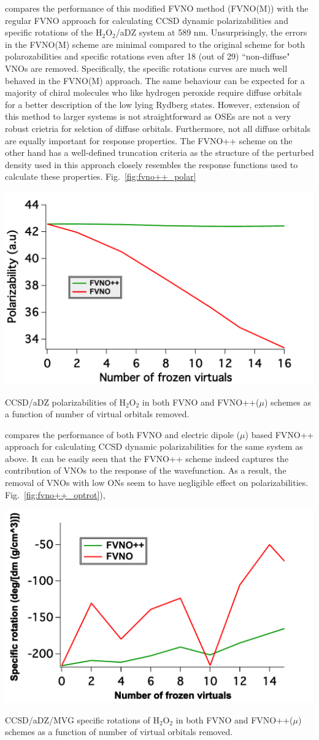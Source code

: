compares the performance of this modified FVNO method (FVNO(M)) with the regular 
FVNO approach for calculating CCSD dynamic polarizabilities and specific rotations 
of the H$_2$O$_2$/aDZ system at 589 nm. Unsurprisingly, the errors in the FVNO(M) 
scheme are minimal compared to the original scheme for both polarozabilities and 
specific rotations even after 18 (out of 29) ``non-diffuse" VNOs are removed.
Specifically, the specific rotations curves are much well behaved in the 
FVNO(M) approach. The same behaviour can be expected for a majority of chiral molecules who 
like hydrogen peroxide require diffuse orbitals for a better description of the low lying 
Rydberg states. However, extension of this method to larger systems is not straightforward as OSEs are not a very robust 
crietria for selction of diffuse orbitals. Furthermore, not all diffuse orbitals 
are equally important for response properties. The FVNO++ scheme on the other
hand has a well-defined truncation criteria as the structure of the perturbed density
used in this approach closely resembles the response functions used to 
calculate these properties. Fig.~\ref{fig:fvno++_polar} 
\begin{MyFigure}[h!]
\centering
\includegraphics[width=0.6\linewidth]{figures_fvno++/fvno++_h2o2_adz_polar.pdf}
\caption{{\footnotesize CCSD/aDZ polarizabilities of
H$_2$O$_2$ in both FVNO and FVNO++($\mu$) schemes as a function of
number of virtual orbitals removed.}}
\label{fig:fvno++_polar}
\end{MyFigure}
compares the performance of both FVNO and electric dipole ($\mu$) based FVNO++ approach 
for calculating CCSD dynamic polarizabilities for the same system as above. It can be
easily seen that the FVNO++ scheme indeed captures the contribution of VNOs to
the response of the wavefunction. As a result, the removal of VNOs with low ONs
seem to have negligible effect on polarizabilities. Fig.~\ref{fig:fvno++_optrot}),
\begin{MyFigure}[h!]
\centering
\includegraphics[width=0.6\linewidth]{figures_fvno++/fvno++_h2o2_adz_optrot.pdf}
\caption{{\footnotesize CCSD/aDZ/MVG specific rotations of
H$_2$O$_2$ in both FVNO and FVNO++($\mu$) schemes as a function of
number of virtual orbitals removed.}}
\label{fig:fvno++_optrot}
\end{MyFigure}
